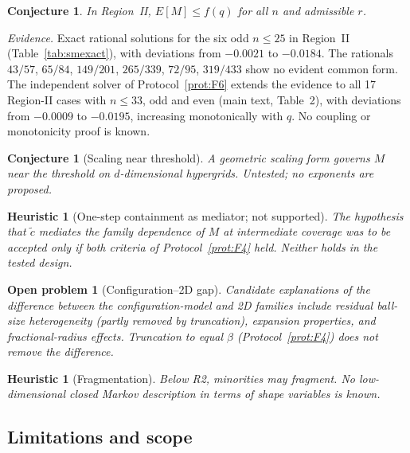 \documentclass[pdflatex,sn-mathphys-num]{sn-jnl}
\theoremstyle{thmstyleone}%
\newtheorem{conjecture}[theorem]{Conjecture}
\newtheorem{openq}[theorem]{Open problem}
\newtheorem{heuristic}[theorem]{Heuristic}
\theoremstyle{thmstylethree}%
\theoremstyle{thmstyletwo}%
\newcommand{\ctil}{\tilde{c}}
\begin{document}
\begin{conjecture}
\label{conj:G1}
In Region~II, $E[M]\le f(q)$ for all $n$ and admissible $r$.
\end{conjecture}

\emph{Evidence.} Exact rational solutions for the six odd $n\le25$ in
Region~II (Table~\ref{tab:smexact}), with deviations from $-0.0021$ to
$-0.0184$. The rationals $43/57$, $65/84$, $149/201$, $265/339$, $72/95$,
$319/433$ show no evident common form. The independent solver of
Protocol~\ref{prot:F6} extends the evidence to all 17 Region-II cases
with $n\le33$, odd and even (main text, Table~2), with deviations from
$-0.0009$ to $-0.0195$, increasing monotonically with $q$. No coupling or
monotonicity proof is known.

\begin{conjecture}[Scaling near threshold]
\label{conj:G2}
A geometric scaling form governs $M$ near the threshold on
$d$-dimensional hypergrids. Untested; no exponents are proposed.
\end{conjecture}

\begin{heuristic}[One-step containment as mediator; not supported]
\label{conj:G3}
The hypothesis that $\ctil$ mediates the family dependence of $M$ at
intermediate coverage was to be accepted only if both criteria of
Protocol~\ref{prot:F4} held. Neither holds in the tested design.
\end{heuristic}

\begin{openq}[Configuration--2D gap]
\label{open:G4}
Candidate explanations of the difference between the configuration-model
and 2D families include residual ball-size heterogeneity (partly removed
by truncation), expansion properties, and fractional-radius effects.
Truncation to equal $\beta$ (Protocol~\ref{prot:F4}) does not remove the
difference.
\end{openq}

\begin{heuristic}[Fragmentation]
\label{heur:G5}
Below R2, minorities may fragment. No low-dimensional closed Markov
description in terms of shape variables is known.
\end{heuristic}

\subsection*{Limitations and scope}
\label{sec:limitations}
\end{document}
